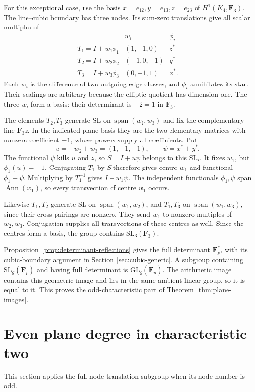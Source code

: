 \documentclass[11pt]{article}
\begin{document}
For this exceptional case, use the basis $x=e_{12},y=e_{13},z=e_{23}$ of $H^1(K_4,\mathbf F_3)$. The line--cubic boundary has three nodes. Its sum-zero translations give all scalar multiples of
\[
 \begin{array}{c|c|c}
 &w_i&\phi_i\\\hline
 T_1=I+w_1\phi_1&(1,-1,0)&z^*\\
 T_2=I+w_2\phi_2&(-1,0,-1)&y^*\\
 T_3=I+w_3\phi_3&(0,-1,1)&x^*.
 \end{array}
\]
Each $w_i$ is the difference of two outgoing edge classes, and $\phi_i$ annihilates its star. Their scalings are arbitrary because the elliptic quotient has dimension one. The three $w_i$ form a basis: their determinant is $-2=1$ in $\mathbf F_3$.

The elements $T_2,T_3$ generate $\mathrm{SL}$ on $\operatorname{span}(w_2,w_3)$ and fix the complementary line $\mathbf F_3z$. In the indicated plane basis they are the two elementary matrices with nonzero coefficient $-1$, whose powers supply all coefficients. Put
\[
 u=-w_2+w_3=(1,-1,-1),\qquad \psi=x^*+y^*.
\]
The functional $\psi$ kills $u$ and $z$, so $S=I+u\psi$ belongs to this $\mathrm{SL}_2$. It fixes $w_1$, but $\phi_1(u)=-1$. Conjugating $T_1$ by $S$ therefore gives centre $w_1$ and functional $\phi_1+\psi$. Multiplying by $T_1^{-1}$ gives $I+w_1\psi$. The independent functionals $\phi_1,\psi$ span $\operatorname{Ann}(w_1)$, so every transvection of centre $w_1$ occurs.

Likewise $T_1,T_2$ generate $\mathrm{SL}$ on $\operatorname{span}(w_1,w_2)$, and $T_1,T_3$ on $\operatorname{span}(w_1,w_3)$, since their cross pairings are nonzero. They send $w_1$ to nonzero multiples of $w_2,w_3$. Conjugation supplies all transvections of these centres as well. Since the centres form a basis, the group contains $\mathrm{SL}_3(\mathbf F_3)$.

Proposition~\ref{prop:determinant-reflections} gives the full determinant $\mathbf F_p^*$, with its cubic-boundary argument in Section~\ref{sec:cubic-generic}. A subgroup containing $\mathrm{SL}_g(\mathbf F_p)$ and having full determinant is $\mathrm{GL}_g(\mathbf F_p)$. The arithmetic image contains this geometric image and lies in the same ambient linear group, so it is equal to it. This proves the odd-characteristic part of Theorem~\ref{thm:plane-images}.

\section{Even plane degree in characteristic two}\label{sec:plane-even}
This section applies the full node-translation subgroup when its node number is odd.
\end{document}
